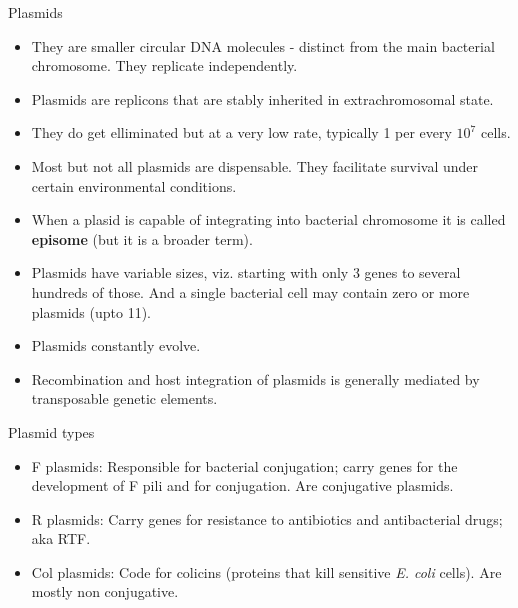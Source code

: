 \documentclass[11pt,dvipsnames,ignorenonframetext,aspectratio=169]{beamer}
\providecommand{\tightlist}{%
  \setlength{\itemsep}{0pt}\setlength{\parskip}{0pt}}
\begin{document}
\begin{frame}{Plasmids}
\protect\hypertarget{plasmids}{}

\begin{itemize}
\tightlist
\item
  They are smaller circular DNA molecules - distinct from the main
  bacterial chromosome. They replicate independently.
\item
  Plasmids are replicons that are stably inherited in extrachromosomal
  state.
\item
  They do get elliminated but at a very low rate, typically 1 per every
  \(10^{7}\) cells.
\item
  Most but not all plasmids are dispensable. They facilitate survival
  under certain environmental conditions.
\item
  When a plasid is capable of integrating into bacterial chromosome it
  is called \textbf{episome} (but it is a broader term).
\item
  Plasmids have variable sizes, viz. starting with only 3 genes to
  several hundreds of those. And a single bacterial cell may contain
  zero or more plasmids (upto 11).
\item
  Plasmids constantly evolve.
\item
  Recombination and host integration of plasmids is generally mediated
  by transposable genetic elements.
\end{itemize}

\end{frame}

\begin{frame}{Plasmid types}
\protect\hypertarget{plasmid-types}{}

\begin{itemize}
\tightlist
\item
  F plasmids: Responsible for bacterial conjugation; carry genes for the
  development of F pili and for conjugation. Are conjugative plasmids.
\item
  R plasmids: Carry genes for resistance to antibiotics and
  antibacterial drugs; aka RTF.
\item
  Col plasmids: Code for colicins (proteins that kill sensitive \emph{E.
  coli} cells). Are mostly non conjugative.
\end{itemize}

\end{frame}
\end{document}
